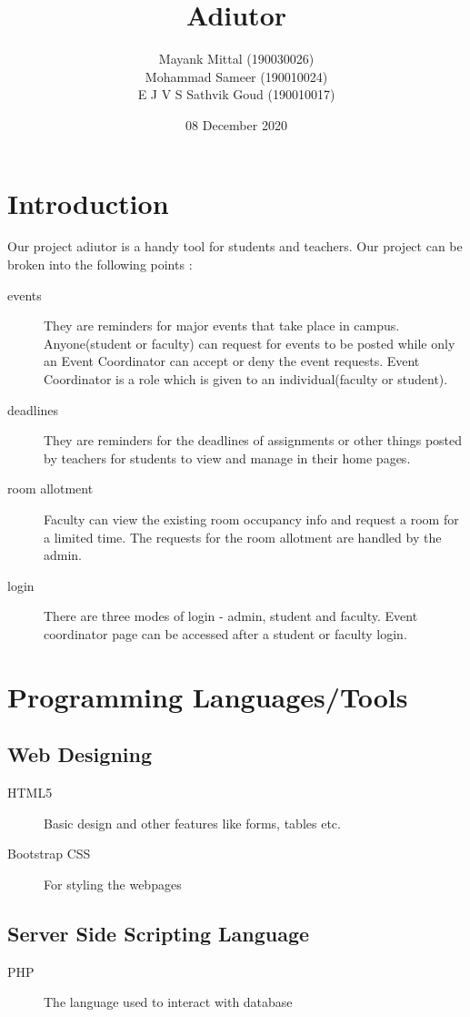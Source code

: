 \documentclass[12pt]{article}
\title{\textbf{Adiutor}}
\author{Mayank Mittal (190030026) \\ Mohammad Sameer (190010024)\\ E J V S Sathvik Goud (190010017)}
\date{08 December 2020}
\begin{document}
\maketitle

\section{Introduction}
Our project adiutor is a handy tool for students and teachers. Our project can be broken into the following points : 
\begin{description}
    \item[events] They are reminders for major events that take place in campus. Anyone(student or faculty) can request for events to be posted while only an Event Coordinator can accept or deny the event requests. Event Coordinator is a role which is given to an individual(faculty or student).
    \item [deadlines] They are reminders for the deadlines of assignments or other things posted by teachers for students to view and manage in their home pages.
    \item [room allotment] Faculty can view the existing room occupancy info  and request a room for a limited time. The requests for the room allotment are handled by the admin.
    \item [login] There are three modes of login - admin, student and faculty. Event coordinator page can be accessed after a student or faculty login.
\end{description}

\section{Programming Languages/Tools}
\subsection{Web Designing}
\begin{description}
    \item[HTML5] Basic design and other features like forms, tables etc.
    \item[Bootstrap CSS] For styling the webpages
\end{description}

\subsection{Server Side Scripting Language}
\begin{description}
    \item[PHP] The language used to interact with database
\end{description}
\end{document}
